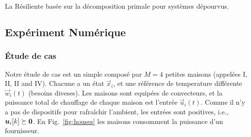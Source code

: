 \documentclass[../main.tex]{subfiles}
\begin{document}
\begin{algorithm2e}[h]
  \DontPrintSemicolon
  \caption{La \dmpc{} Résiliente basée sur la décomposition primale pour systèmes dépourvus.}\label{alg:rpdbdmpcss_fr}
\end{algorithm2e}

\subsection{Expériment Numérique}\label{sec:numerical-experiment_fr}

\subsubsection{Étude de cas}\label{sec:case-study}

Notre étude de cas est un simple \dhn{} composé par ${M=4}$ petites maisons (appelées I, II, II and IV).
Chacune a un état $\vec{x}_{i}$, et une référence de temperature différente $\vec{w}_{i}(t)$ (besoins diveses).
Les maisons sont equipées de convecteurs, et la puissance total de chauffage de chaque maison est l'entrée $\vec{u}_{i}(t)$.
Comme il n'y a pas de dispositifs pour rafraîchir l'ambient, les entrées sont positives, i.e., $\boldsymbol{u}_{i}[k]\succeq\mathbf{0}$.
En Fig.~\ref{fig:houses} les maisons consomment la puissance d'un fournisseur.
\end{document}
